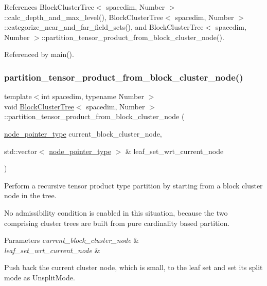 References Block\+Cluster\+Tree$<$ spacedim, Number $>$\+::calc\+\_\+depth\+\_\+and\+\_\+max\+\_\+level(), Block\+Cluster\+Tree$<$ spacedim, Number $>$\+::categorize\+\_\+near\+\_\+and\+\_\+far\+\_\+field\+\_\+sets(), and Block\+Cluster\+Tree$<$ spacedim, Number $>$\+::partition\+\_\+tensor\+\_\+product\+\_\+from\+\_\+block\+\_\+cluster\+\_\+node().



Referenced by main().

\mbox{\label{classBlockClusterTree_ae77f8167ce49871f5751b8dcf8c93153}} 
\subsubsection{\texorpdfstring{partition\+\_\+tensor\+\_\+product\+\_\+from\+\_\+block\+\_\+cluster\+\_\+node()}{partition\_tensor\_product\_from\_block\_cluster\_node()}}
{\footnotesize\ttfamily template$<$int spacedim, typename Number $>$ \\
void \hyperlink{classBlockClusterTree}{Block\+Cluster\+Tree}$<$ spacedim, Number $>$\+::partition\+\_\+tensor\+\_\+product\+\_\+from\+\_\+block\+\_\+cluster\+\_\+node (\begin{DoxyParamCaption}\item[{\hyperlink{classTreeNode}{node\+\_\+pointer\+\_\+type}}]{current\+\_\+block\+\_\+cluster\+\_\+node,  }\item[{std\+::vector$<$ \hyperlink{classTreeNode}{node\+\_\+pointer\+\_\+type} $>$ \&}]{leaf\+\_\+set\+\_\+wrt\+\_\+current\+\_\+node }\end{DoxyParamCaption})\hspace{0.3cm}{\ttfamily [private]}}

Perform a recursive tensor product type partition by starting from a block cluster node in the tree.

No admissibility condition is enabled in this situation, because the two comprising cluster trees are built from pure cardinality based partition. 
\begin{DoxyParams}{Parameters}
{\em current\+\_\+block\+\_\+cluster\+\_\+node} & \\
\hline
{\em leaf\+\_\+set\+\_\+wrt\+\_\+current\+\_\+node} & \\
\hline
\end{DoxyParams}
Push back the current cluster node, which is small, to the leaf set and set its split mode as {\ttfamily Unsplit\+Mode}.

